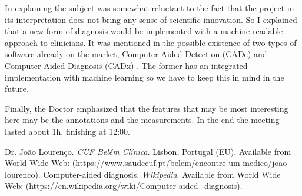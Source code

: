\documentclass[a4paper, 11pt]{article}
\begin{document}
In explaining the subject was somewhat reluctant to the fact that the project in its interpretation does not bring any sense of scientific innovation. So I explained that a new form of diagnosis would be implemented with a machine-readable approach to clinicians. It was mentioned in the possible existence of two types of software already on the market, Computer-Aided Detection (CADe) and Computer-Aided Diagnosis (CADx) \cite{computerAidedDiagnosis}. The former has an integrated implementation with machine learning so we have to keep this in mind in the future.

Finally, the Doctor emphasized that the features that may be most interesting here may be the annotations and the measurements. In the end the meeting lasted about 1h, finishing at 12:00.



\begin{thebibliography}{9}
  Dr. Jo\~{a}o Louren\c{c}o. \emph{CUF Bel\'{e}m Cl\'{i}nica}. Lisbon, Portugal (EU). Available from World Wide Web: (https://www.saudecuf.pt/belem/encontre-um-medico/joao-lourenco).
  Computer-aided diagnosis. \emph{Wikipedia}. Available from World Wide Web: (https://en.wikipedia.org/wiki/Computer-aided\_diagnosis).
\end{thebibliography}
\end{document}
